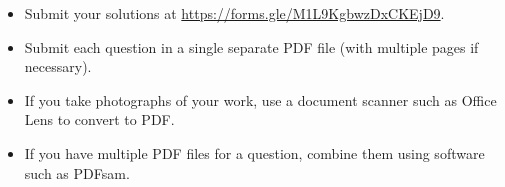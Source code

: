 \documentclass{article}
\begin{document}
\vfill
\begin{itemize}
	\item Submit your solutions at \url{https://forms.gle/M1L9KgbwzDxCKEjD9}.
	\item Submit each question in a single separate PDF file (with multiple pages if necessary).
	\item If you take photographs of your work, use a document scanner such as Office Lens to convert to PDF.
	\item If you have multiple PDF files for a question, combine them using software such as PDFsam.
\end{itemize}

\vfill
\centering
\begin{BVerbatim}

\end{BVerbatim}
\end{document}

